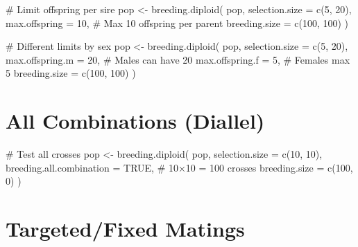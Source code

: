 \documentclass[
  letterpaper,
]{book}
\newenvironment{Shaded}{\begin{snugshade}}{\end{snugshade}}
\newcommand{\AttributeTok}[1]{\textcolor[rgb]{0.40,0.45,0.13}{#1}}
\newcommand{\CommentTok}[1]{\textcolor[rgb]{0.37,0.37,0.37}{#1}}
\newcommand{\ConstantTok}[1]{\textcolor[rgb]{0.56,0.35,0.01}{#1}}
\newcommand{\DecValTok}[1]{\textcolor[rgb]{0.68,0.00,0.00}{#1}}
\newcommand{\FunctionTok}[1]{\textcolor[rgb]{0.28,0.35,0.67}{#1}}
\newcommand{\NormalTok}[1]{\textcolor[rgb]{0.00,0.23,0.31}{#1}}
\newcommand{\OtherTok}[1]{\textcolor[rgb]{0.00,0.23,0.31}{#1}}
\begin{document}
\begin{Shaded}
\begin{Highlighting}[]
\CommentTok{\# Limit offspring per sire}
\NormalTok{pop }\OtherTok{\textless{}{-}} \FunctionTok{breeding.diploid}\NormalTok{(}
\NormalTok{  pop,}
  \AttributeTok{selection.size =} \FunctionTok{c}\NormalTok{(}\DecValTok{5}\NormalTok{, }\DecValTok{20}\NormalTok{),}
  \AttributeTok{max.offspring =} \DecValTok{10}\NormalTok{,             }\CommentTok{\# Max 10 offspring per parent}
  \AttributeTok{breeding.size =} \FunctionTok{c}\NormalTok{(}\DecValTok{100}\NormalTok{, }\DecValTok{100}\NormalTok{)}
\NormalTok{)}

\CommentTok{\# Different limits by sex}
\NormalTok{pop }\OtherTok{\textless{}{-}} \FunctionTok{breeding.diploid}\NormalTok{(}
\NormalTok{  pop,}
  \AttributeTok{selection.size =} \FunctionTok{c}\NormalTok{(}\DecValTok{5}\NormalTok{, }\DecValTok{20}\NormalTok{),}
  \AttributeTok{max.offspring.m =} \DecValTok{20}\NormalTok{,           }\CommentTok{\# Males can have 20}
  \AttributeTok{max.offspring.f =} \DecValTok{5}\NormalTok{,            }\CommentTok{\# Females max 5}
  \AttributeTok{breeding.size =} \FunctionTok{c}\NormalTok{(}\DecValTok{100}\NormalTok{, }\DecValTok{100}\NormalTok{)}
\NormalTok{)}
\end{Highlighting}
\end{Shaded}

\section{All Combinations (Diallel)}\label{all-combinations-diallel}

\begin{Shaded}
\begin{Highlighting}[]
\CommentTok{\# Test all crosses}
\NormalTok{pop }\OtherTok{\textless{}{-}} \FunctionTok{breeding.diploid}\NormalTok{(}
\NormalTok{  pop,}
  \AttributeTok{selection.size =} \FunctionTok{c}\NormalTok{(}\DecValTok{10}\NormalTok{, }\DecValTok{10}\NormalTok{),}
  \AttributeTok{breeding.all.combination =} \ConstantTok{TRUE}\NormalTok{,  }\CommentTok{\# 10×10 = 100 crosses}
  \AttributeTok{breeding.size =} \FunctionTok{c}\NormalTok{(}\DecValTok{100}\NormalTok{, }\DecValTok{0}\NormalTok{)}
\NormalTok{)}
\end{Highlighting}
\end{Shaded}

\section{Targeted/Fixed Matings}\label{targetedfixed-matings}
\end{document}
